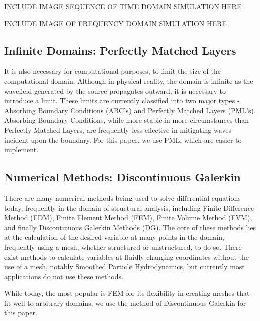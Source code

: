 INCLUDE IMAGE SEQUENCE OF TIME DOMAIN SIMULATION HERE

INCLUDE IMAGE OF FREQUENCY DOMAIN SIMULATION HERE

\subsection{Infinite Domains: Perfectly Matched Layers}

It is also necessary for computational purposes, to limit the size of the computational domain. Although in physical reality, the domain is infinite as the wavefield generated by the source propagates outward, it is necessary to introduce a limit. These limits are currently classified into two major types - Absorbing Boundary Conditions (ABC's) and Perfectly Matched Layers (PML's). Absorbing Boundary Conditions, while more stable in more circumstances than Perfectly Matched Layers, are frequently less effective in mitigating waves incident upon the boundary. For this paper, we use PML, which are easier to implement.

\subsection{Numerical Methods: Discontinuous Galerkin}

There are many numerical methods being used to solve differential equations today, frequently in the domain of structural analysis, including Finite Difference Method (FDM), Finite Element Method (FEM), Finite Volume Method (FVM), and finally Discontinuous Galerkin Methods (DG). The core of these methods lies at the calculation of the desired variable at many points in the domain, frequently using a mesh, whether structured or unstructured, to do so. There exist methods to calculate variables at fluidly changing coordinates without the use of a mesh, notably Smoothed Particle Hydrodynamics, but currently most applications do not use these methods. 

While today, the most popular is FEM for its flexibility in creating meshes that fit well to arbitrary domains, we use the method of Discontinuous Galerkin for this paper.







